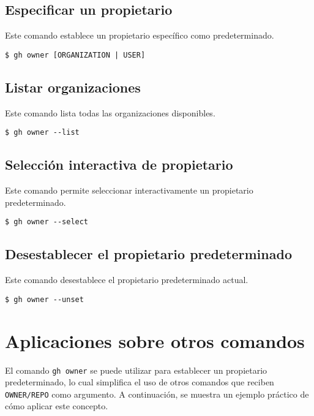 \subsection{Especificar un propietario}

Este comando establece un propietario específico como predeterminado.

\begin{verbatim}
$ gh owner [ORGANIZATION | USER]
\end{verbatim}

\subsection{Listar organizaciones}

Este comando lista todas las organizaciones disponibles.

\begin{verbatim}
$ gh owner --list
\end{verbatim}

\subsection{Selección interactiva de propietario}

Este comando permite seleccionar interactivamente un propietario predeterminado.

\begin{verbatim}
$ gh owner --select
\end{verbatim}

\subsection{Desestablecer el propietario predeterminado}

Este comando desestablece el propietario predeterminado actual.

\begin{verbatim}
$ gh owner --unset
\end{verbatim}

\section{Aplicaciones sobre otros comandos}

El comando \texttt{gh owner} se puede utilizar para establecer un propietario predeterminado, lo cual simplifica el uso de otros comandos que reciben \texttt{OWNER/REPO} como argumento. A continuación, se muestra un ejemplo práctico de cómo aplicar este concepto.

